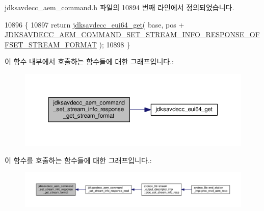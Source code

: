 jdksavdecc\+\_\+aem\+\_\+command.\+h 파일의 10894 번째 라인에서 정의되었습니다.


\begin{DoxyCode}
10896 \{
10897     \textcolor{keywordflow}{return} \hyperlink{group__eui64_ga2652311a25a6b91cddbed75c108c7031}{jdksavdecc\_eui64\_get}( base, pos + 
      \hyperlink{group__command__set__stream__info__response_ga5ce2c20d3bc892909bc27dba602826b3}{JDKSAVDECC\_AEM\_COMMAND\_SET\_STREAM\_INFO\_RESPONSE\_OFFSET\_STREAM\_FORMAT}
       );
10898 \}
\end{DoxyCode}


이 함수 내부에서 호출하는 함수들에 대한 그래프입니다.\+:
\nopagebreak
\begin{figure}[H]
\begin{center}
\leavevmode
\includegraphics[width=350pt]{group__command__set__stream__info__response_ga68def33404fd92dcfe5c8d0b48a35b2f_cgraph}
\end{center}
\end{figure}




이 함수를 호출하는 함수들에 대한 그래프입니다.\+:
\nopagebreak
\begin{figure}[H]
\begin{center}
\leavevmode
\includegraphics[width=350pt]{group__command__set__stream__info__response_ga68def33404fd92dcfe5c8d0b48a35b2f_icgraph}
\end{center}
\end{figure}


